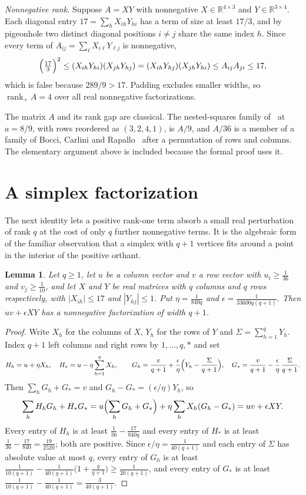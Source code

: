 \documentclass[11pt]{article}
\newtheorem{lemma}{Lemma}
\theoremstyle{remark}
\newcommand{\rp}{\operatorname{rank}_+}
\begin{document}
\emph{Nonnegative rank.} Suppose $A=XY$ with nonnegative $X\in\mathbb{R}^{4\times3}$ and $Y\in\mathbb{R}^{3\times4}$. Each diagonal entry $17=\sum_hX_{ih}Y_{hi}$ has a term of size at least $17/3$, and by pigeonhole two distinct diagonal positions $i\ne j$ share the same index $h$. Since every term of $A_{ij}=\sum_\ell X_{i\ell}Y_{\ell j}$ is nonnegative,
\[
\Bigl(\tfrac{17}{3}\Bigr)^2\le(X_{ih}Y_{hi})(X_{jh}Y_{hj})=(X_{ih}Y_{hj})(X_{jh}Y_{hi})\le A_{ij}A_{ji}\le17,
\]
which is false because $289/9>17$. Padding excludes smaller widths, so $\rp A=4$ over all real nonnegative factorizations.

The matrix $A$ and its rank gap are classical. The nested-squares family of~\cite[\S6.1]{VGGT} at $a=8/9$, with rows reordered as $(3,2,4,1)$, is $A/9$, and $A/36$ is a member of a family of Bocci, Carlini and Rapallo~\cite{BCR} after a permutation of rows and columns. The elementary argument above is included because the formal proof uses it.

\section{A simplex factorization}\label{sec:simplex}

The next identity lets a positive rank-one term absorb a small real perturbation of rank $q$ at the cost of only $q$ further nonnegative terms. It is the algebraic form of the familiar observation that a simplex with $q+1$ vertices fits around a point in the interior of the positive orthant.

\begin{lemma}\label{lem:simplex}
Let $q\ge1$, let $u$ be a column vector and $v$ a row vector with $u_i\ge\frac{1}{36}$ and $v_j\ge\frac{1}{10}$, and let $X$ and $Y$ be real matrices with $q$ columns and $q$ rows respectively, with $|X_{ih}|\le17$ and $|Y_{hj}|\le1$. Put $\eta=\frac{1}{840q}$ and $\epsilon=\frac{1}{33600q(q+1)}$. Then $uv+\epsilon XY$ has a nonnegative factorization of width $q+1$.
\end{lemma}

\begin{proof}
Write $X_h$ for the columns of $X$, $Y_h$ for the rows of $Y$ and $\Sigma=\sum_{h=1}^qY_h$. Index $q+1$ left columns and right rows by $1,\dots,q,*$ and set
\[
H_h=u+\eta X_h,\quad H_*=u-\eta\sum_{h=1}^qX_h,\qquad
G_h=\frac{v}{q+1}+\frac{\epsilon}{\eta}\Bigl(Y_h-\frac{\Sigma}{q+1}\Bigr),\quad G_*=\frac{v}{q+1}-\frac{\epsilon}{\eta}\,\frac{\Sigma}{q+1}.
\]
Then $\sum_hG_h+G_*=v$ and $G_h-G_*=(\epsilon/\eta)Y_h$, so
\[
\sum_hH_hG_h+H_*G_*=u\Bigl(\sum_hG_h+G_*\Bigr)+\eta\sum_hX_h(G_h-G_*)=uv+\epsilon XY.
\]
Every entry of $H_h$ is at least $\frac{1}{36}-\frac{17}{840q}$ and every entry of $H_*$ is at least $\frac{1}{36}-\frac{17}{840}=\frac{19}{2520}$; both are positive. Since $\epsilon/\eta=\frac{1}{40(q+1)}$ and each entry of $\Sigma$ has absolute value at most $q$, every entry of $G_h$ is at least $\frac{1}{10(q+1)}-\frac{1}{40(q+1)}\bigl(1+\frac{q}{q+1}\bigr)\ge\frac{1}{20(q+1)}$, and every entry of $G_*$ is at least $\frac{1}{10(q+1)}-\frac{1}{40(q+1)}=\frac{3}{40(q+1)}$.
\end{proof}
\end{document}
